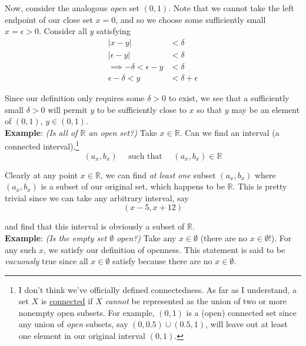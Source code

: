 \documentclass[12pt]{article}
\newlength\tindent
\renewcommand{\indent}{\hspace*{\tindent}}
\newcommand{\R}{\mathbb R}
\begin{document}
\indent Now, consider the analogous {\em open} set $(0, 1)$. Note that we cannot take the left endpoint of our close set $x = 0$, and so we choose some sufficiently small $x = \epsilon > 0$. Consider all $y$ satisfying
\begin{align*}
	|x - y| &< \delta \\
	|\epsilon - y| &< \delta \\
	\implies -\delta < \epsilon - y &< \delta \\
	\epsilon - \delta < y &< \delta + \epsilon
\end{align*}

\indent Since our definition only requires some $\delta > 0$ to exist, we see that a sufficiently small $\delta > 0$ will permit $y$ to be sufficiently close to $x$ so that $y$ may be an element of $(0, 1)$, $y \in (0, 1)$. \\

%
% 
{\bf Example}: {\em (Is all of $\R$ an open set?)} Take $x \in \R$. Can we find an interval (a connected interval),\footnote{I don't think we've officially defined connectedness. As far as I understand, a set $X$ is \underline{connected} if $X$ {\em cannot} be represented as the union of two or more nonempty open subsets. For example, $(0,1)$ is a (open) connected set since any union of {\em open} subsets, say $(0, 0.5) \cup (0.5, 1)$, will leave out at least one element in our original interval $(0, 1)$.}
\begin{equation*}
	(a_x, b_x) \quad \text{ such that } \quad (a_x, b_x) \in \R
\end{equation*}

\indent Clearly at any point $x \in \R$, we can find {\em at least one} subset $(a_x, b_x)$ where $(a_x, b_x)$ is a subset of our original set, which happens to be $\R$. This is pretty trivial since we can take any arbitrary interval, say
\begin{equation*}
	(x - 5, x + 12)
\end{equation*}

and find that this interval is obviously a subset of $\R$. \\

%
%
{\bf Example}: {\em (Is the empty set $\emptyset$ open?)} Take any $x \in \emptyset$ (there are no $x \in \emptyset$!). For any such $x$, we satisfy our definition of openness. This statement is said to be {\em vacuously} true since all $x \in \emptyset$ satisfy because there are no $x \in \emptyset$. \\
\end{document}
